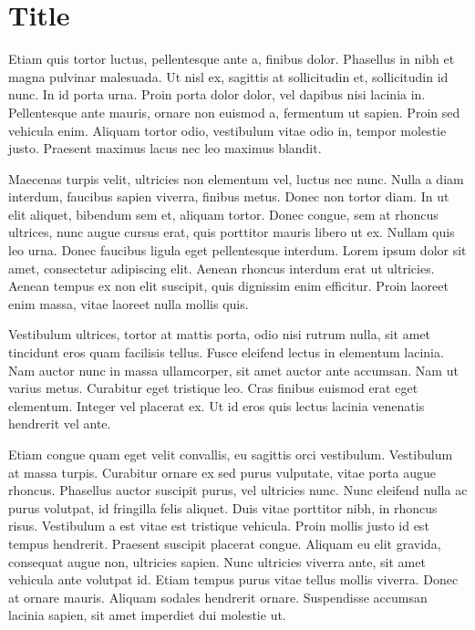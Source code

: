 \documentclass[
  a5paper,
  smalldemyvopaper,10pt,twoside,onecolumn,openright,extrafontsizes,hidelinks]{memoir}
\begin{document}
\chapter{Title}\label{title-4}

Etiam quis tortor luctus, pellentesque ante a, finibus dolor. Phasellus
in nibh et magna pulvinar malesuada. Ut nisl ex, sagittis at
sollicitudin et, sollicitudin id nunc. In id porta urna. Proin porta
dolor dolor, vel dapibus nisi lacinia in. Pellentesque ante mauris,
ornare non euismod a, fermentum ut sapien. Proin sed vehicula enim.
Aliquam tortor odio, vestibulum vitae odio in, tempor molestie justo.
Praesent maximus lacus nec leo maximus blandit.

Maecenas turpis velit, ultricies non elementum vel, luctus nec nunc.
Nulla a diam interdum, faucibus sapien viverra, finibus metus. Donec non
tortor diam. In ut elit aliquet, bibendum sem et, aliquam tortor. Donec
congue, sem at rhoncus ultrices, nunc augue cursus erat, quis porttitor
mauris libero ut ex. Nullam quis leo urna. Donec faucibus ligula eget
pellentesque interdum. Lorem ipsum dolor sit amet, consectetur
adipiscing elit. Aenean rhoncus interdum erat ut ultricies. Aenean
tempus ex non elit suscipit, quis dignissim enim efficitur. Proin
laoreet enim massa, vitae laoreet nulla mollis quis.

Vestibulum ultrices, tortor at mattis porta, odio nisi rutrum nulla, sit
amet tincidunt eros quam facilisis tellus. Fusce eleifend lectus in
elementum lacinia. Nam auctor nunc in massa ullamcorper, sit amet auctor
ante accumsan. Nam ut varius metus. Curabitur eget tristique leo. Cras
finibus euismod erat eget elementum. Integer vel placerat ex. Ut id eros
quis lectus lacinia venenatis hendrerit vel ante.

Etiam congue quam eget velit convallis, eu sagittis orci vestibulum.
Vestibulum at massa turpis. Curabitur ornare ex sed purus vulputate,
vitae porta augue rhoncus. Phasellus auctor suscipit purus, vel
ultricies nunc. Nunc eleifend nulla ac purus volutpat, id fringilla
felis aliquet. Duis vitae porttitor nibh, in rhoncus risus. Vestibulum a
est vitae est tristique vehicula. Proin mollis justo id est tempus
hendrerit. Praesent suscipit placerat congue. Aliquam eu elit gravida,
consequat augue non, ultricies sapien. Nunc ultricies viverra ante, sit
amet vehicula ante volutpat id. Etiam tempus purus vitae tellus mollis
viverra. Donec at ornare mauris. Aliquam sodales hendrerit ornare.
Suspendisse accumsan lacinia sapien, sit amet imperdiet dui molestie ut.
\end{document}
